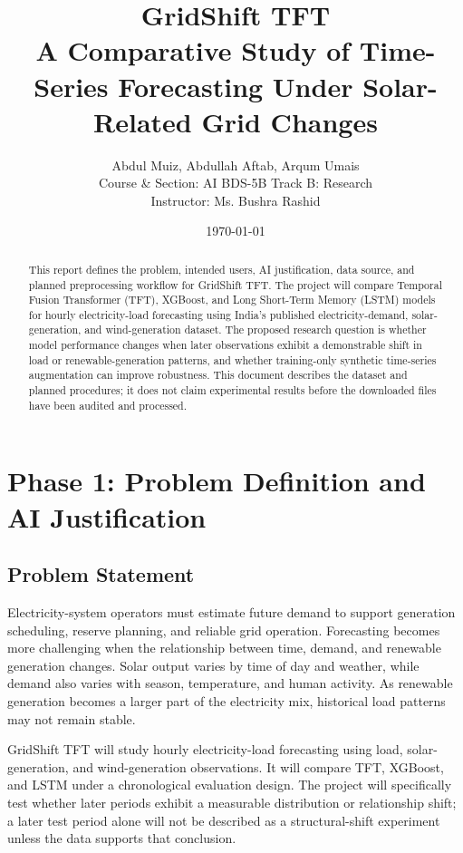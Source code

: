 \documentclass[12pt,a4paper]{article}
\title{\textbf{GridShift TFT}\\
A Comparative Study of Time-Series Forecasting Under Solar-Related Grid Changes}
\author{Abdul Muiz, Abdullah Aftab, Arqum Umais \\
Course \& Section: AI BDS-5B \textbar{} Track B: Research \\
Instructor: Ms. Bushra Rashid}
\date{\today}
\begin{document}
\maketitle

\begin{abstract}
This report defines the problem, intended users, AI justification, data source, and planned preprocessing workflow for GridShift TFT. The project will compare Temporal Fusion Transformer (TFT), XGBoost, and Long Short-Term Memory (LSTM) models for hourly electricity-load forecasting using India's published electricity-demand, solar-generation, and wind-generation dataset. The proposed research question is whether model performance changes when later observations exhibit a demonstrable shift in load or renewable-generation patterns, and whether training-only synthetic time-series augmentation can improve robustness. This document describes the dataset and planned procedures; it does not claim experimental results before the downloaded files have been audited and processed.
\end{abstract}

\section{Phase 1: Problem Definition and AI Justification}

\subsection{Problem Statement}
Electricity-system operators must estimate future demand to support generation scheduling, reserve planning, and reliable grid operation. Forecasting becomes more challenging when the relationship between time, demand, and renewable generation changes. Solar output varies by time of day and weather, while demand also varies with season, temperature, and human activity. As renewable generation becomes a larger part of the electricity mix, historical load patterns may not remain stable.

GridShift TFT will study hourly electricity-load forecasting using load, solar-generation, and wind-generation observations. It will compare TFT, XGBoost, and LSTM under a chronological evaluation design. The project will specifically test whether later periods exhibit a measurable distribution or relationship shift; a later test period alone will not be described as a structural-shift experiment unless the data supports that conclusion.
\end{document}
